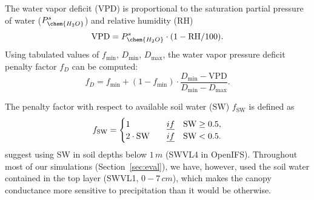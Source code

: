\documentclass[gmd, manuscript]{copernicus}
\begin{document}
The water vapor deficit (VPD) is proportional to the saturation partial pressure of water ($P_\chem{H_2O}^s$) and relative humidity ($\text{RH}$)
%
\begin{equation}
  \text{VPD} = P_\chem{H_2O}^s \cdot (1 - \text{RH}/100).
\end{equation}
%
Using tabulated values of $f_\text{min}$, $D_\text{min}$, $D_\text{max}$, the water vapor pressure deficit penalty factor $f_D$ can be computed:
%
\begin{equation}
  f_D = f_\text{min}+(1-f_\text{min}) \cdot \frac{D_\text{min} - \text{VPD}}{D_\text{min}-D_\text{max}}.
\end{equation}

The penalty factor with respect to available soil water ($\text{SW}$) $f_\text{SW}$ is defined as 
%
\begin{equation}
  f_\text{SW} =
  \begin{cases}
    1 & \quad \emph{if} \quad \text{SW} \geq 0.5,\\
    2 \cdot \text{SW}  & \quad \emph{if} \quad \text{SW} < 0.5.
  \end{cases}
\end{equation}
\citet{ACP:Simpson2012} suggest using SW in soil depths below $1\,\unit{m}$ (SWVL4 in OpenIFS). Throughout most of our simulations (Section~\ref{sec:eval}), we have, however, used the soil water contained in the top layer (SWVL1, $0-7\,\unit{cm}$), which makes the canopy conductance more sensitive to precipitation than it would be otherwise.
\end{document}
